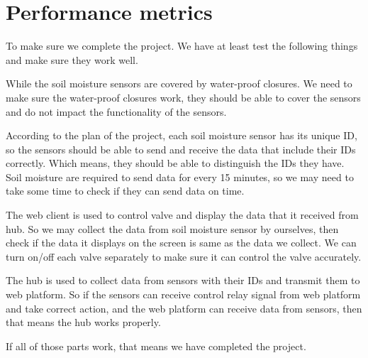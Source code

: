 \documentclass[10pt,onecolumn,journal,draftclsnofoot]{IEEEtran}
\begin{document}
\section{Performance metrics}
\par
To make sure we complete the project. We have at least test the following things and make sure they work well. 
\par
While the soil moisture sensors are covered by water-proof closures. We need to make sure the water-proof closures work, they should be able to cover the sensors and do not impact the functionality of the sensors. 
\par
According to the plan of the project, each soil moisture sensor has its unique ID, so the sensors should be able to send and receive the data that include their IDs correctly. Which means, they should be able to distinguish the IDs they have. Soil moisture are required to send data for every 15 minutes, so we may need to take some time to check if they can send data on time.
\par
The web client is used to control valve and display the data that it received from hub. So we may collect the data from soil moisture sensor by ourselves, then check if the data it displays on the screen is same as the data we collect. We can turn on/off each valve separately to make sure it can control the valve accurately.
\par
The hub is used to collect data from sensors with their IDs and transmit them to web platform. So if the sensors can receive control relay signal from web platform and take correct action, and the web platform can receive data from sensors, then that means the hub works properly.
\\
\par
If all of those parts work, that means we have completed the project.
\end{document}
